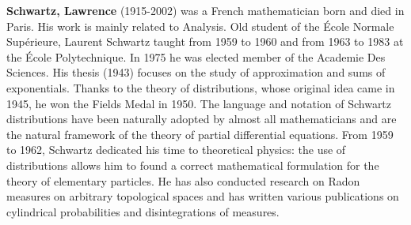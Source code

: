 \textbf{Schwartz, Lawrence} (1915-2002) was a French mathematician born and died in Paris. His work is mainly related to Analysis. Old student of the École Normale Supérieure, Laurent Schwartz taught from 1959 to 1960 and from 1963 to 1983 at the École Polytechnique. In 1975 he was elected member of the Academie Des Sciences. His thesis (1943) focuses on the study of approximation and sums of exponentials. Thanks to the theory of distributions, whose original idea came in 1945, he won the Fields Medal in 1950. The language and notation of Schwartz distributions have been naturally adopted by almost all mathematicians and are the natural framework of the theory of partial differential equations. From 1959 to 1962, Schwartz dedicated his time to theoretical physics: the use of distributions allows him to found a correct mathematical formulation for the theory of elementary particles. He has also conducted research on Radon measures on arbitrary topological spaces and has written various publications on cylindrical probabilities and disintegrations of measures.

